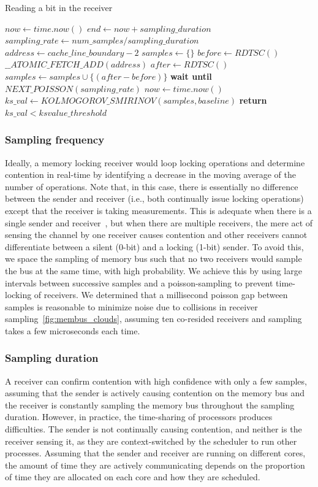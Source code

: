 \begin{algorithm}[!t]
\caption{Reading a bit in the receiver}
\label{alg:receiver}
\begin{algorithmic}[1]
\STATE $now \leftarrow  time.now()$
\STATE $end \leftarrow now + sampling\_duration$
\STATE $sampling\_rate \leftarrow num\_samples / sampling\_duration$
\STATE $address \leftarrow cache\_line\_boundary-2$
\STATE $samples \leftarrow \{\} $
    \STATE $before \leftarrow RDTSC()$
    \STATE $\_\_ATOMIC\_FETCH\_ADD(address)$
    \STATE $after \leftarrow RDTSC()$
    \STATE $samples \leftarrow samples \cup \{(after-before)\}$
    \STATE \textbf{wait until} $NEXT\_POISSON(sampling\_rate)$
    \STATE $now \leftarrow  time.now()$
\ENDWHILE
\STATE $ks\_val \leftarrow KOLMOGOROV\_SMIRINOV(samples, baseline)$
\STATE \textbf{return} $ks\_val < ksvalue\_threshold$
\end{algorithmic}
\end{algorithm}


\subsubsection{Sampling frequency}
Ideally, a memory locking receiver would loop locking operations and determine
contention in real-time by identifying a decrease in the moving average of the
number of operations. Note that, in this case, there is essentially no
difference between the sender and receiver (i.e., both continually issue locking
operations) except that the receiver is taking measurements. This is adequate
when there is a single sender and receiver~\cite{varadarajan2015}, but when
there are multiple receivers, the mere act of sensing the channel by one
receiver causes contention and other receivers cannot differentiate between a
silent (0-bit) and a locking (1-bit) sender. To avoid this, we space the
sampling of memory bus such that no two receivers would sample the bus at the
same time, with high probability.  We achieve this by using large intervals
between successive samples and a poisson-sampling to prevent time-locking of
receivers. We determined that a millisecond poisson gap between samples is
reasonable to minimize noise due to collisions in receiver
sampling~\ref{fig:membus_clouds}, assuming ten co-resided receivers and sampling
takes a few microseconds each time.

\subsubsection{Sampling duration}
\label{sec:method:samplingdur}
A receiver can confirm contention with high confidence with only a few samples,
assuming that the sender is actively causing contention on the memory bus and
the receiver is constantly sampling the memory bus throughout the sampling
duration.  However, in practice, the time-sharing of processors produces
difficulties.  The sender is not continually causing contention, and neither is
the receiver sensing it, as they are context-switched by the scheduler to run
other processes.  Assuming that the sender and receiver are running on different
cores, the amount of time they are actively communicating depends on the
proportion of time they are allocated on each core and how they are scheduled. 

